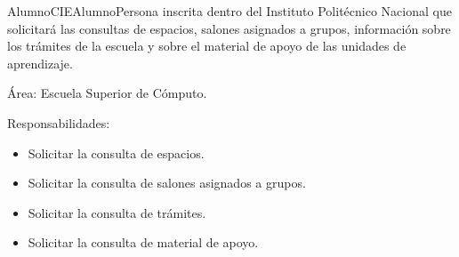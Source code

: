    \begin{actor}{Alumno}{CIEAlumno}{Persona inscrita dentro del Instituto Politécnico Nacional que solicitará las consultas de espacios, salones asignados a grupos, información sobre los trámites de la escuela y sobre el material de apoyo de las unidades de aprendizaje.}

	\item[Área:] Escuela Superior de Cómputo.

	\item[Responsabilidades:] \hspace{1pt}
	
		\begin{itemize}

		    \item Solicitar la consulta de espacios.
		    \item Solicitar la consulta de salones asignados a grupos.
		    \item Solicitar la consulta de trámites.
		    \item Solicitar la consulta de material de apoyo.



\end{itemize}
\end{actor}
